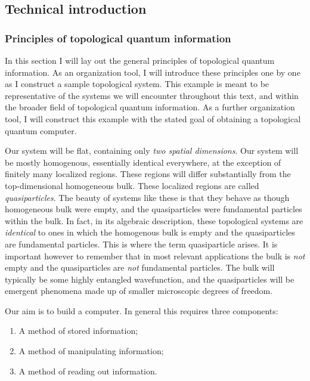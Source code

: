\documentclass{article}
\theoremstyle{definition}
\numberwithin{figure}{section}
\begin{document}
\subsection{Technical introduction}

\subsubsection{Principles of topological quantum information}

In this section I will lay out the general principles of topological quantum information. As an organization tool, I will introduce these principles one by one as I construct a sample topological system. This example is meant to be representative of the systems we will encounter throughout this text, and within the broader field of topological quantum information. As a further organization tool, I will construct this example with the stated goal of obtaining a topological quantum computer.

Our system will be flat, containing only \textit{two spatial dimensions}. Our system will be mostly homogenous, essentially identical everywhere, at the exception of finitely many localized regions. These regions will differ substantially from the top-dimensional homogeneous bulk. These localized regions are called \textit{quasiparticles}. The beauty of systems like these is that they behave as though homogeneous bulk were empty, and the quasiparticles were fundamental particles within the bulk. In fact, in its algebraic description, these topological systems are \textit{identical} to ones in which the homogenous bulk is empty and the quasiparticles are fundamental particles. This is where the term quasiparticle arises. It is important however to remember that in most relevant applications the bulk is \textit{not} empty and the quasiparticles are \textit{not} fundamental particles. The bulk will typically be some highly entangled wavefunction, and the quasiparticles will be emergent phenomena made up of smaller microscopic degrees of freedom.

Our aim is to build a computer. In general this requires three components:

\begin{enumerate}
\item A method of stored information;
\item A method of manipulating information;
\item A method of reading out information.
\end{enumerate}
\end{document}
